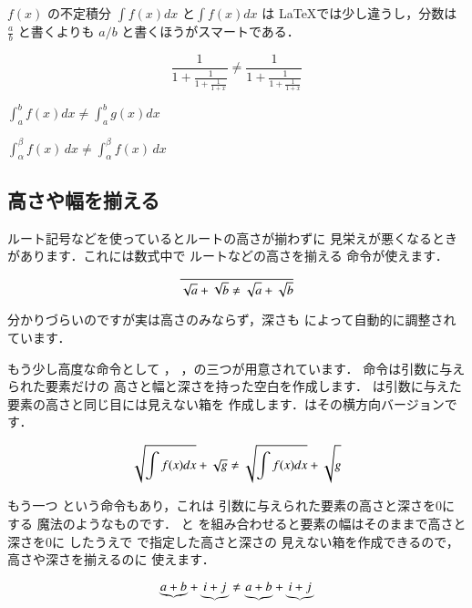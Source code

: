 
\begin{inout}
\(f(x)\) の不定積分 \(\int f(x)dx\)
と\(\displaystyle \int f(x)dx\) は
\LaTeX では少し違うし，分数は 
$\frac{a}{b}$ と書くよりも $a/b$ 
と書くほうがスマートである．
\end{inout}

\begin{inout}
\[ 
 \frac{1}{1+\frac{1}{1+\frac{1}{1+x}}}
 \neq \frac{1}{\displaystyle 1+
 \frac{1}{\displaystyle 1+
 \frac{1}{1+x}}} \]
\end{inout}
%
\begin{inout}
\( \int^b_a f(x)dx \neq 
   {\displaystyle\int^b_a g(x)dx}
\) 
\end{inout}

\begin{inout}
\(\int^\beta_\alpha f(x)\,dx \neq 
{\displaystyle\int^\beta_\alpha f(x)\,dx}\)
\end{inout}

\subsection{高さや幅を揃える}
%
%
%

ルート記号などを使っているとルートの高さが揃わずに
見栄えが悪くなるときがあります．これには数式中で
ルートなどの高さを揃える 命令が使えます．
\begin{inout}
\[ \overline{\sqrt a + \sqrt b 
   \neq \sqrt{\mathstrut a}+
   \sqrt{\mathstrut b}} \]
\end{inout}
分かりづらいのですが実は高さのみならず，深さも 
によって自動的に調整されています．

もう少し高度な命令として ，
，の三つが用意されています．
命令は引数に与えられた要素だけの
高さと幅と深さを持った空白を作成します．
は引数に与えた要素の高さと同じ目には見えない箱を
作成します．はその横方向バージョンです．
\begin{inout}
\[ \sqrt{\int f(x)dx} + \sqrt{g} \neq 
   \sqrt{\int f(x)dx} + \sqrt 
   {\vphantom{\int f(x)dx} g} \]
\end{inout}
もう一つ という命令もあり，これは
引数に与えられた要素の高さと深さを0にする
魔法のようなものです． と 
を組み合わせると要素の幅はそのままで高さと深さを0に
したうえで で指定した高さと深さの
見えない箱を作成できるので，{高さや深さを揃えるのに}
使えます．%
\begin{inout}
\[ \underbrace{a + b} + \underbrace{i + j}
 \neq \underbrace{\smash{a + b}
 \vphantom{i + j}} + \underbrace{i + j}\]
\end{inout}

